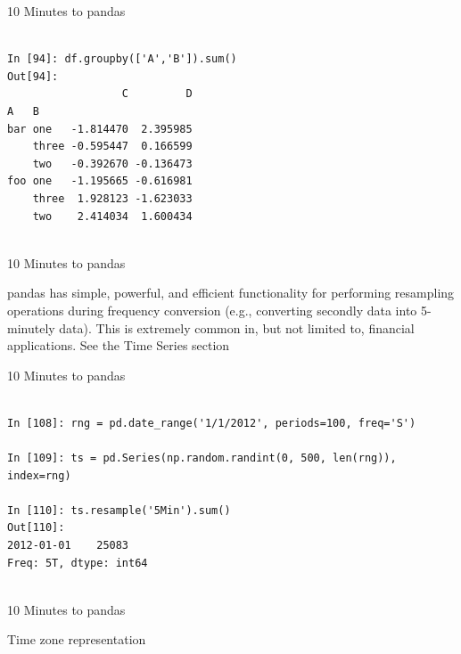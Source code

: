 \documentclass{beamer}
\begin{document}
\begin{frame}[t,fragile]{10 Minutes to pandas}


	\scriptsize
\begin{verbatim}

In [94]: df.groupby(['A','B']).sum()
Out[94]: 
                  C         D
A   B                        
bar one   -1.814470  2.395985
    three -0.595447  0.166599
    two   -0.392670 -0.136473
foo one   -1.195665 -0.616981
    three  1.928123 -1.623033
    two    2.414034  1.600434


\end{verbatim}


\end{frame}






\begin{frame}[t]{10 Minutes to pandas}

pandas has simple, powerful, and efficient functionality for performing
resampling operations during frequency conversion (e.g., converting secondly
data into 5-minutely data). This is extremely common in, but not limited to,
financial applications. See the Time Series section

\end{frame}


\begin{frame}[t,fragile]{10 Minutes to pandas}


	\scriptsize
\begin{verbatim}

In [108]: rng = pd.date_range('1/1/2012', periods=100, freq='S')

In [109]: ts = pd.Series(np.random.randint(0, 500, len(rng)), index=rng)

In [110]: ts.resample('5Min').sum()
Out[110]: 
2012-01-01    25083
Freq: 5T, dtype: int64


\end{verbatim}


\end{frame}


\begin{frame}[t]{10 Minutes to pandas}

Time zone representation

\end{frame}
\end{document}

